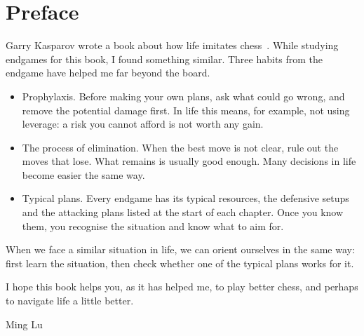 \chapter{Preface}

Garry Kasparov wrote a book about how life imitates chess~\cite{Kasparov:2007-life}. While studying
endgames for this book, I found something similar. Three habits from the endgame have helped me
far beyond the board.

\begin{itemize}
\item Prophylaxis. Before making your own plans, ask what could go wrong, and remove the potential
damage first. In life this means, for example, not using leverage: a risk you cannot afford is not
worth any gain.

\item The process of elimination. When the best move is not clear, rule out the moves that lose.
What remains is usually good enough. Many decisions in life become easier the same way.

\item Typical plans. Every endgame has its typical resources, the defensive setups and the attacking
plans listed at the start of each chapter. Once you know them, you recognise the situation and know
what to aim for.
\end{itemize}

When we face a similar situation in life, we can orient ourselves in the same way: first learn the
situation, then check whether one of the typical plans works for it.

I hope this book helps you, as it has helped me, to play better chess, and perhaps to navigate life
a little better.

\begin{flushright}
Ming Lu
\end{flushright}
